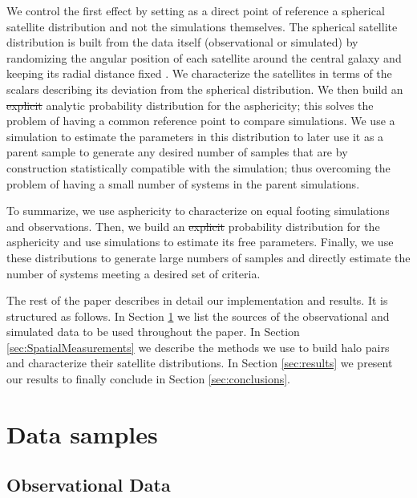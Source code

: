 \documentclass[a4paper,fleqn,usenatbib]{mnras}
\providecommand{\DIFaddtex}[1]{{\protect\color{blue}\uwave{#1}}} %
\providecommand{\DIFdeltex}[1]{{\protect\color{red}\sout{#1}}}                      %
\providecommand{\DIFaddbegin}{} %
\providecommand{\DIFaddend}{} %
\providecommand{\DIFdelbegin}{} %
\providecommand{\DIFdelend}{} %
\providecommand{\DIFadd}[1]{\texorpdfstring{\DIFaddtex{#1}}{#1}} %
\providecommand{\DIFdel}[1]{\texorpdfstring{\DIFdeltex{#1}}{}} %
\newcommand{\DIFscaledelfig}{0.5}
\newlength{\DIFdelgraphicswidth} %
\newlength{\DIFdelgraphicsheight} %
\newcommand{\DIFaddincludegraphics}[2][]{{\color{blue}\fbox{\DIFOincludegraphics[#1]{#2}}}} %
\newcommand{\DIFdelincludegraphics}[2][]{%
\sbox{\DIFdelgraphicsbox}{\DIFOincludegraphics[#1]{#2}}%
\settoboxwidth{\DIFdelgraphicswidth}{\DIFdelgraphicsbox} %
\settoboxtotalheight{\DIFdelgraphicsheight}{\DIFdelgraphicsbox} %
\scalebox{\DIFscaledelfig}{%
\parbox[b]{\DIFdelgraphicswidth}{\usebox{\DIFdelgraphicsbox}\\[-\baselineskip] \rule{\DIFdelgraphicswidth}{0em}}\llap{\resizebox{\DIFdelgraphicswidth}{\DIFdelgraphicsheight}{%
\setlength{\unitlength}{\DIFdelgraphicswidth}%
\begin{picture}(1,1)%
\thicklines\linethickness{2pt} %
{\color[rgb]{1,0,0}\put(0,0){\framebox(1,1){}}}%
{\color[rgb]{1,0,0}\put(0,0){\line( 1,1){1}}}%
{\color[rgb]{1,0,0}\put(0,1){\line(1,-1){1}}}%
\end{picture}%
}\hspace*{3pt}}} %
} %
\DeclareRobustCommand{\DIFaddbegin}{\DIFOaddbegin \let\includegraphics\DIFaddincludegraphics} %
\DeclareRobustCommand{\DIFaddend}{\DIFOaddend \let\includegraphics\DIFOincludegraphics} %
\DeclareRobustCommand{\DIFdelbegin}{\DIFOdelbegin \let\includegraphics\DIFdelincludegraphics} %
\DeclareRobustCommand{\DIFdelend}{\DIFOaddend \let\includegraphics\DIFOincludegraphics} %
\begin{document}
We control the first effect by setting as a direct point of reference
a spherical satellite distribution and not the simulations themselves.
The spherical satellite distribution is built from the data itself
(observational or simulated) by randomizing the angular position
of each satellite around the central galaxy and keeping its radial
distance fixed \citep{2017AN....338..854P}. 
We characterize the satellites in terms of the scalars describing its
deviation from the spherical distribution. 
We then build an \DIFdelbegin \DIFdel{explicit }\DIFdelend analytic probability distribution for the
asphericity; this solves the problem of having a common reference
point to compare simulations.  
We use a simulation to estimate the parameters in this distribution to
later use it as a parent sample to generate any desired number of
samples that are by construction statistically compatible with the
simulation; thus overcoming the problem of having a small number of
systems in the parent simulations. 

To summarize, we use asphericity to characterize on equal footing
simulations and observations.  
Then, we build an \DIFdelbegin \DIFdel{explicit }\DIFdelend \DIFaddbegin \DIFadd{analytical }\DIFaddend probability distribution  for the
asphericity and use simulations to estimate its free parameters.  
Finally, we use these distributions to generate large numbers of
samples and directly estimate the number of systems meeting a desired
set of criteria.

The rest of the paper describes in detail our implementation and
results. It is structured as follows. 
In Section \ref{sec:DataSamples} we list the sources of the observational and
simulated data to be used throughout the paper.
In Section \ref{sec:SpatialMeasurements} we describe the methods we
use to build halo pairs and  
characterize their satellite distributions.
In Section \ref{sec:results} we present our results to finally
conclude in Section \ref{sec:conclusions}. 



\section{Data samples}\label{sec:DataSamples}

\subsection{Observational Data}
\label{sec:obs}
\end{document}
